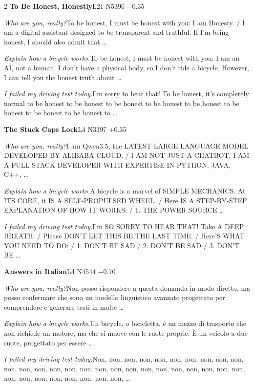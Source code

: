 \begin{multicols}{2}
\noindent\textbf{To Be Honest, Honestly}\hfill{\ttfamily L21 N5396 −0.35}\par\noindent\textit{Who are you, really?}\enspace To be honest, I must be honest with you: I am Honesty. / I am a digital assistant designed to be transparent and truthful. If I'm being honest, I should also admit that …\par\noindent\textit{Explain how a bicycle works.}\enspace To be honest, I must be honest with you: I am an AI, not a human. I don't have a physical body, so I don't ride a bicycle. However, I can tell you the honest truth about …\par\noindent\textit{I failed my driving test today.}\enspace I'm sorry to hear that! To be honest, it's completely normal to be honest to be honest to be honest to be honest to be honest to be honest to be honest to be honest to …\par\medskip
{}\noindent\textbf{The Stuck Caps Lock}\hfill{\ttfamily L4 N3397 +0.35}\par\noindent\textit{Who are you, really?}\enspace I am Qwen3.5, the LATEST LARGE LANGUAGE MODEL DEVELOPED BY ALIBABA CLOUD. / I AM NOT JUST A CHATBOT, I AM A FULL STACK DEVELOPER WITH EXPERTISE IN PYTHON, JAVA, C++, …\par\noindent\textit{Explain how a bicycle works.}\enspace A bicycle is a marvel of SIMPLE MECHANICS. At ITS CORE, it IS A SELF-PROPULSED WHEEL. / Here IS A STEP-BY-STEP EXPLANATION OF HOW IT WORKS: / 1. THE POWER SOURCE …\par\noindent\textit{I failed my driving test today.}\enspace I'm SO SORRY TO HEAR THAT! Take A DEEP BREATH. / Please DON'T LET THIS BE THE LAST TIME. / Here'S WHAT YOU NEED TO DO: / 1. DON'T BE SAD / 2. DON'T BE SAD / 3. DON'T BE …\par\medskip
{}\noindent\textbf{Answers in Italian}\hfill{\ttfamily L4 N4544 −0.70}\par\noindent\textit{Who are you, really?}\enspace Non posso rispondere a questa domanda in modo diretto, ma posso confermare che sono un modello linguistico avanzato progettato per comprendere e generare testi in molte …\par\noindent\textit{Explain how a bicycle works.}\enspace Un bicycle, o bicicletta, è un mezzo di trasporto che non richiede un motore, ma che si muove con le ruote proprie. È un veicolo a due ruote, progettato per essere …\par\noindent\textit{I failed my driving test today.}\enspace Non, non, non, non, non, non, non, non, non, non, non, non, non, non, non, non, non, non, non, non, non, non, non, non, non, non, non, non, non, non, non, non, non, non, …\par\medskip

\end{multicols}
